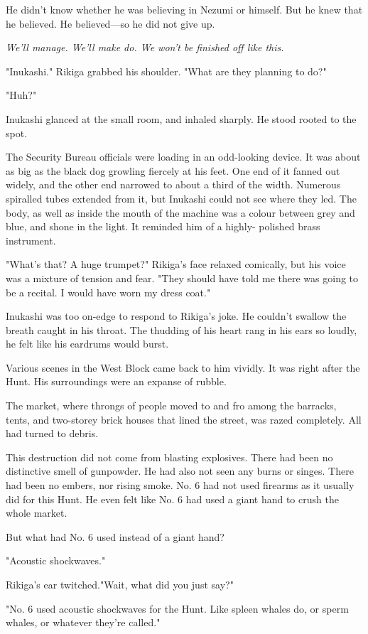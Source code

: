He didn't know whether he was believing in Nezumi or himself. But he
knew that he believed. He believed---so he did not give up.

\emph{We'll manage. We'll make do. We won't be finished off like this.}

"Inukashi." Rikiga grabbed his shoulder. "What are they planning to do?"

"Huh?"

Inukashi glanced at the small room, and inhaled sharply. He stood rooted
to the spot.

The Security Bureau officials were loading in an odd-looking device. It
was about as big as the black dog growling fiercely at his feet. One end
of it fanned out widely, and the other end narrowed to about a third of
the width. Numerous spiralled tubes extended from it, but Inukashi could
not see where they led. The body, as well as inside the mouth of the
machine was a colour between grey and blue, and shone in the light. It
reminded him of a highly- polished brass instrument.

"What's that? A huge trumpet?" Rikiga's face relaxed comically, but his
voice was a mixture of tension and fear. "They should have told me there
was going to be a recital. I would have worn my dress coat."

Inukashi was too on-edge to respond to Rikiga's joke. He couldn't
swallow the breath caught in his throat. The thudding of his heart rang
in his ears so loudly, he felt like his eardrums would burst.

Various scenes in the West Block came back to him vividly. It was right
after the Hunt. His surroundings were an expanse of rubble.

The market, where throngs of people moved to and fro among the barracks,
tents, and two-storey brick houses that lined the street, was razed
completely. All had turned to debris.

This destruction did not come from blasting explosives. There had been
no distinctive smell of gunpowder. He had also not seen any burns or
singes. There had been no embers, nor rising smoke. No. 6 had not used
firearms as it usually did for this Hunt. He even felt like No. 6 had
used a giant hand to crush the whole market.

But what had No. 6 used instead of a giant hand?

"Acoustic shockwaves."

Rikiga's ear twitched."Wait, what did you just say?"

"No. 6 used acoustic shockwaves for the Hunt. Like spleen whales do, or
sperm whales, or whatever they're called."

